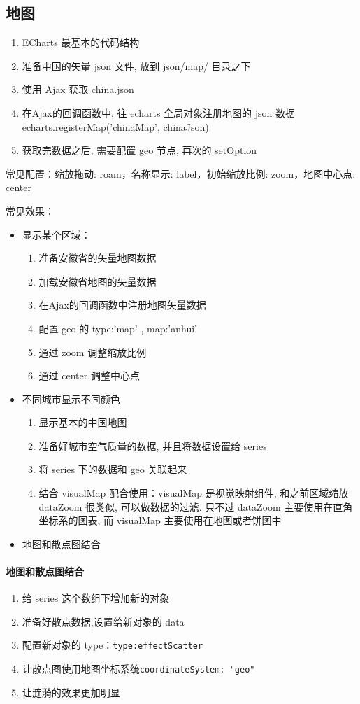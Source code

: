 \subsection{地图}
\begin{enumerate}
    \item ECharts 最基本的代码结构
    \item 准备中国的矢量 json 文件, 放到 json/map/ 目录之下
    \item 使用 Ajax 获取 china.json
    \item 在Ajax的回调函数中, 往 echarts 全局对象注册地图的 json 数据 echarts.registerMap('chinaMap', chinaJson)
    \item 获取完数据之后, 需要配置 geo 节点, 再次的 setOption
\end{enumerate}

常见配置：缩放拖动: roam，名称显示: label，初始缩放比例: zoom，地图中心点: center

常见效果：
\begin{itemize}
    \item 显示某个区域：
    \begin{enumerate}
        \item 准备安徽省的矢量地图数据
        \item 加载安徽省地图的矢量数据
        \item 在Ajax的回调函数中注册地图矢量数据
        \item 配置 geo 的 type:'map' , map:'anhui'
        \item 通过 zoom 调整缩放比例
        \item 通过 center 调整中心点
    \end{enumerate}
    \item 不同城市显示不同颜色
    \begin{enumerate}
        \item 显示基本的中国地图
        \item 准备好城市空气质量的数据, 并且将数据设置给 series
        \item 将 series 下的数据和 geo 关联起来
        \item 结合 visualMap 配合使用：visualMap 是视觉映射组件, 和之前区域缩放 dataZoom 很类似, 可以做数据的过滤. 只不过 dataZoom 主要使用在直角坐标系的图表, 而 visualMap 主要使用在地图或者饼图中
    \end{enumerate}
    \item 地图和散点图结合
\end{itemize}
\paragraph{地图和散点图结合}
\begin{enumerate}
    \item 给 series 这个数组下增加新的对象
    \item 准备好散点数据,设置给新对象的 data
    \item 配置新对象的 type：\verb|type:effectScatter|
    \item 让散点图使用地图坐标系统\verb|coordinateSystem: "geo"|
    \item 让涟漪的效果更加明显
\end{enumerate}

